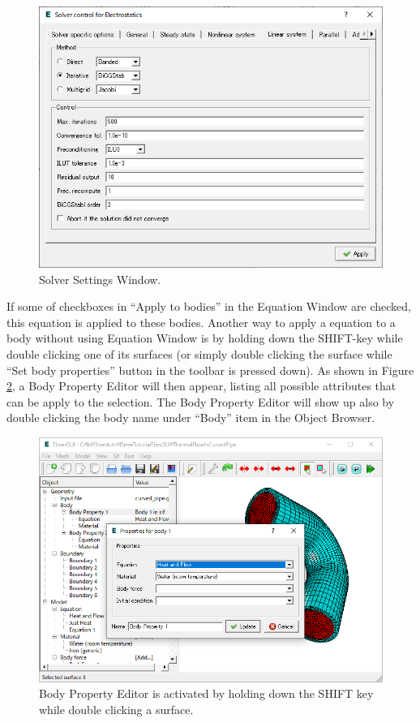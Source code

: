 \begin{figure}[htb]
\begin{center}
 \includegraphics[scale=0.5]{images/solversettings.png}
\caption{Solver Settings Window.}
\label{fig:solversettings}
\end{center}
\end{figure}

If some of checkboxes in ``Apply to bodies'' in the Equation Window are checked, this equation is applied to these bodies. 
Another way to apply a equation to a body without using Equation Window is by holding down the SHIFT-key while double clicking one of its surfaces (or simply double clicking the surface while ``Set body properties'' button in the toolbar is pressed down).
As shown in Figure \ref{fig:bodypropertyeditor}, a Body Property Editor will then appear,
listing all possible attributes that can be apply to the selection. The Body Property Editor will show up also by double clicking the body name under ``Body'' item in the Object Browser. 


\begin{figure}[htb]
\begin{center}
 \includegraphics[scale=0.5]{images/bodyproperties.png}
\caption{Body Property Editor is activated by holding down the SHIFT key while double
clicking a surface.}
\label{fig:bodypropertyeditor}
\end{center}
\end{figure}

